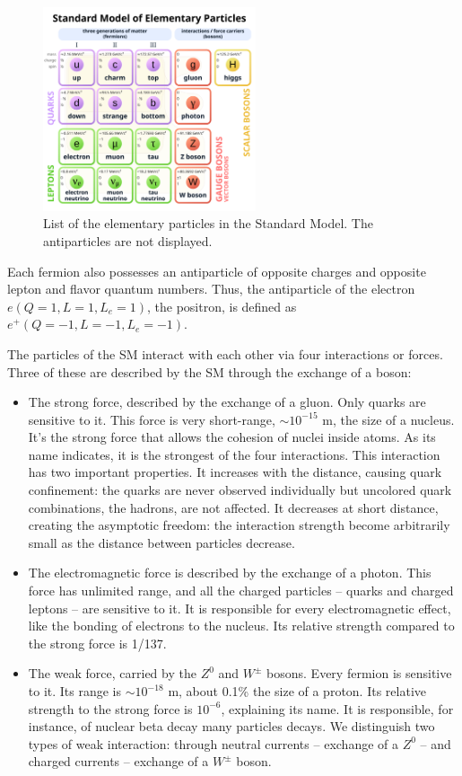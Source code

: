 \documentclass[../main.tex]{subfiles}
\begin{document}
\begin{figure}
  \centering
  \includegraphics[height=6cm]{images/neutrinos/sm.png}
  \caption{List of the elementary particles in the Standard Model. The antiparticles are not displayed.}
  \label{fig:neutrino:sm}
\end{figure}

Each fermion also possesses an antiparticle of opposite charges and opposite lepton and flavor quantum numbers. Thus, the antiparticle of the electron $e (Q=1, L=1, L_e=1)$, the positron, is defined as $e^+ (Q=-1, L=-1, L_e=-1)$.

The particles of the SM interact with each other via four interactions or forces. Three of these are described by the SM through the exchange of a boson:
\begin{itemize}
  \item The strong force, described by the exchange of a gluon. Only quarks are sensitive to it. This force is very short-range, $\sim 10^{-15}$ m, the size of a nucleus. It's the strong force that allows the cohesion of nuclei inside atoms. As its name indicates, it is the strongest of the four interactions. This interaction has two important properties. It increases with the distance, causing quark confinement: the quarks are never observed individually but uncolored quark combinations, the hadrons, are not affected. It decreases at short distance, creating the asymptotic freedom: the interaction strength become arbitrarily small as the distance between particles decrease.

  \item The electromagnetic force is described by the exchange of a photon. This force has unlimited range, and all the charged particles -- quarks and charged leptons -- are sensitive to it. It is responsible for every electromagnetic effect, like the bonding of electrons to the nucleus. Its relative strength compared to the strong force is 1/137.

  \item The weak force, carried by the $Z^0$ and $W^{\pm}$ bosons. Every fermion is sensitive to it. Its range is $\sim 10^{-18}$ m, about 0.1\% the size of a proton. Its relative strength to the strong force is $10^{-6}$, explaining its name. It is responsible, for instance, of nuclear beta decay many particles decays. We distinguish two types of weak interaction: through neutral currents -- exchange of a $Z^0$ -- and charged currents -- exchange of a $W^{\pm}$ boson.
\end{itemize}
\end{document}
